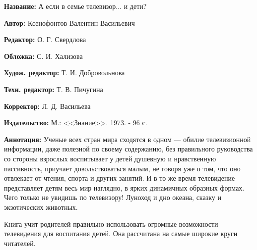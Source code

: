 \documentclass[12pt, a4paper, openany]{book}
\begin{document}
	{\bf Название:} А если в семье телевизор... и дети?
	
{\bf Автор:} Ксенофонтов Валентин Васильевич

{\bf Редактор:} О. Г. Свердлова

{\bf Обложка:} С. И. Хализова

{\bf Худож. редактор:} Т. И. Добровольнова

{\bf Техн. редактор:} Т. В. Пичугина

{\bf Корректор:} Л. Д. Васильева
	
{\bf Издательство:} М.: <<Знание>>. 1973. - 96 с.
	
		{\bf Аннотация:} Ученые всех стран мира сходятся в одном — обилие телевизионной информации, даже полезной по своему содержанию, без правильного руководства со стороны взрослых воспитывает у детей душевную и нравственную пассивность, приучает довольствоваться малым, не говоря уже о том, что оно отвлекает от чтения, спорта и других занятий. И в то же время телевидение представляет детям весь мир наглядно, в ярких динамичных образных формах. Чего только не увидишь по телевизору! Луноход и дно океана, сказку и экзотических животных. 
		
		Книга учит родителей правильно использовать огромные возможности телевидения для воспитания детей. Она рассчитана на самые широкие круги читателей. 
		


		\thispagestyle{empty} %

	
\end{document}
